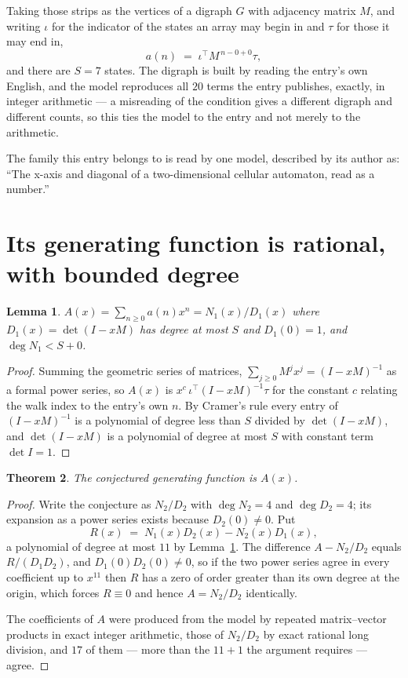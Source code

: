 \documentclass[11pt,a4paper]{article}
\theoremstyle{plain}
\newtheorem{theorem}{Theorem}
\newtheorem{lemma}[theorem]{Lemma}
\theoremstyle{definition}
\begin{document}
Taking those strips as the vertices of a digraph $G$ with adjacency matrix $M$, and writing
$\iota$ for the indicator of the states an array may begin in and $\tau$ for those it may end
in,
\[
a(n)\;=\;\iota^{\!\top}M^{\,n-0+0}\tau ,
\]
and there are $S=7$ states. The digraph is built by reading the entry's own English, and the
model reproduces all $20$ terms the entry publishes, exactly, in integer arithmetic --- a
misreading of the condition gives a different digraph and different counts, so this ties the
model to the entry and not merely to the arithmetic.

The family this entry belongs to is read by one model, described by its author as: ``The x-axis and diagonal of a two-dimensional cellular automaton, read as a number.''


\section{Its generating function is rational, with bounded degree}

\begin{lemma}\label{lem:rat}
$A(x)=\sum_{n\ge0}a(n)x^n=N_1(x)/D_1(x)$ where $D_1(x)=\det(I-xM)$ has degree at most
$S$ and $D_1(0)=1$, and $\deg N_1<S+0$.
\end{lemma}

\begin{proof}
Summing the geometric series of matrices, $\sum_{j\ge0}M^jx^j=(I-xM)^{-1}$ as a formal
power series, so $A(x)$ is $x^{c}\,\iota^{\!\top}(I-xM)^{-1}\tau$ for the constant $c$
relating the walk index to the entry's own $n$. By Cramer's rule every entry of
$(I-xM)^{-1}$ is a polynomial of degree less than $S$ divided by $\det(I-xM)$, and
$\det(I-xM)$ is a polynomial of degree at most $S$ with constant term $\det I=1$.
\end{proof}

\begin{theorem}
The conjectured generating function is $A(x)$.
\end{theorem}

\begin{proof}
Write the conjecture as $N_2/D_2$ with $\deg N_2=4$ and $\deg D_2=4$; its expansion as a
power series exists because $D_2(0)\neq0$. Put
\[
R(x)\;=\;N_1(x)D_2(x)-N_2(x)D_1(x),
\]
a polynomial of degree at most $11$ by Lemma~\ref{lem:rat}. The difference
$A-N_2/D_2$ equals $R/(D_1D_2)$, and $D_1(0)D_2(0)\neq0$, so if the two power series agree in
every coefficient up to $x^{11}$ then $R$ has a zero of order greater than its own
degree at the origin, which forces $R\equiv0$ and hence $A=N_2/D_2$ identically.

The coefficients of $A$ were produced from the model by repeated matrix--vector products in
exact integer arithmetic, those of $N_2/D_2$ by exact rational long division, and $17$
of them --- more than the $11+1$ the argument requires --- agree.
\end{proof}
\end{document}
